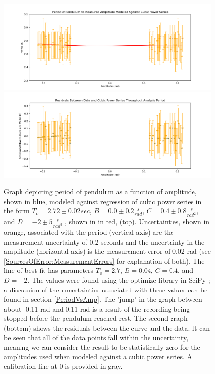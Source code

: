 \documentclass[11pt]{article}
\begin{document}
        \begin{figure}[H]
            \centering\includegraphics[width = \textwidth]{CubicPowerSeriesData.png}
            \centering\includegraphics[width = \textwidth]{CubicPowerSeriesResiduals.png}
            \caption{Graph depicting period of pendulum as a function of amplitude, shown in blue, modeled against regression of cubic power series in the form $T_o = 2.72 \pm 0.02 sec$, $B = 0.0 \pm 0.2 \frac{s}{rad}$,  $C = 0.4 \pm 0.8 \frac{s}{rad^2}$, and $D = -2 \pm 5 \frac{s}{rad^3}$ \cite{labManual}, shown in in red, (top). Uncertainties, shown in orange, associated with the period (vertical axis) are the measurement uncertainty of 0.2 seconds and the uncertainty in the amplitude (horizontal axis) is the measurement error of 0.02 rad (see \ref{SourcesOfError:MeasurementErrors} for explanation of both). The line of best fit has parameters $T_o = 2.7$, $B = 0.04 $, $C = 0.4$, and $D = -2$. The values were found using the optimize library in SciPy \cite{2020SciPy-NMeth}; a discussion of the uncertainties associated with these values can be found in section \ref{PeriodVsAmp}. The 'jump' in the graph between about -0.11 rad and 0.11 rad is a result of the recording being stopped before the pendulum reached rest. The second graph (bottom) shows the residuals between the curve and the data. It can be seen that all of the data points fall within the uncertainty, meaning we can consider the result to be statistically zero for the amplitudes used when modeled against a cubic power series. A calibration line at 0 is provided in gray.}
            \label{fig:CubicPowerSeries}        
        \end{figure}
\end{document}
